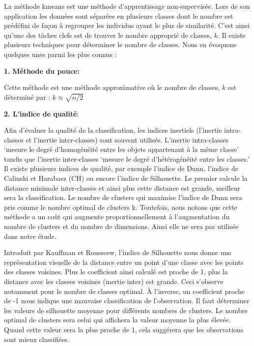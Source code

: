 \documentclass[12pt,a4paper]{book}
\newcommand{\1}{\mathds{1}}
\begin{document}
\noindent
La méthode kmeans est une méthode d'apprentissage non-supervisée. Lors de son application les données sont séparées en plusieurs classes dont le nombre est prédéfini de façon à regrouper les individus ayant le plus de similarité. C'est ainsi qu'une des tâches clefs est de trouver le nombre approprié de classes, $k$. Il existe plusieurs techniques pour déterminer le nombre de classes. Nous en évoquons quelques unes parmi les plus connus : 
\vspace{5 mm}
\begin{description}
  \item \textbf{1.} \textbf{Méthode du pouce:}
  
  Cette méthode est une méthode approximative où le nombre de classes, $k$ est déterminé par : 
$ k \approx \sqrt{n/2}$

\vspace{5 mm}
    \item \textbf{2. L'indice de qualité}:
    
	Afin d'évaluer la qualité de la classification, les indices inertiels (l’inertie intra-classes et l’inertie inter-classes) sont souvent utilisés. L'inertie intra-classes ‘mesure le degré d’homogénéité entre les objets appartenant à la même classe' tandis que l’inertie inter-classes ‘mesure le degré d’hétérogénéité entre les classes.’
Il existe plusieurs indices de qualité, par exemple l’indice de Dunn, l’indice de Calinski et Harabasz (CH) ou encore l’indice de Silhouette. 
Le premier calcule la distance minimale inter-classes et ainsi plus cette distance est grande, meilleur sera la classification. Le nombre de clusters qui maximise l’indice de Dunn sera pris comme le nombre optimal de clusters k. Toutefois, nous notons que cette méthode a un coût qui augmente proportionnellement à l’augmentation du nombre de clusters et du nombre de dimensions. Ainsi elle ne sera pas utilisée dans notre étude.

\vspace{5 mm}
Introduit par Kauffman et Rousseew, l’indice de Silhouette nous donne une représentation visuelle de la distance entre un point d’une classe avec les points des classes voisines. Plus le coefficient ainsi calculé est proche de 1, plus la distance avec les classes voisines (inertie inter) est grande. Ceci s'observe notamment pour le nombre de classes optimal. À l'inverse, un coefficient proche de -1 nous indique une mauvaise classification de l’observation. Il faut déterminer les valeurs de silhouette moyenne pour différents nombres de clusters. Le nombre optimal de clusters sera celui qui affichera la valeur moyenne la plus élevée. Quand cette valeur sera la plus proche de 1, cela  suggérera que les observations sont mieux classifiées.


\end{description}
\end{document}
